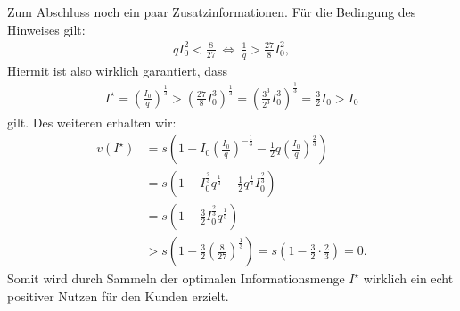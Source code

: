 Zum Abschluss noch ein paar Zusatzinformationen. Für die Bedingung des Hinweises gilt:
\begin{align*}
	q I_0^2 < \frac{8}{27}
	\ \Leftrightarrow \
	\frac{1}{q} > \frac{27 }{8} I_0^2,
\end{align*}
Hiermit ist also wirklich garantiert, dass
\begin{align*}
	I^\star 
	= 
	\left(\frac{I_0}{q}\right)^\frac{1}{3}
	>
	\left(\frac{27}{8} I_0^3\right)^\frac{1}{3}
	=
	\left(\frac{3^3}{2^3} I_0^3\right)^\frac{1}{3}
	= \frac{3}{2} I_0 > I_0
\end{align*}
gilt. Des weiteren erhalten wir:
\begin{align*}
	v(I^\star )
	&=
	s 
	\left(
		1 
		- 
		I_0 \left(\frac{I_0}{q}\right)^{-\frac{1}{3}}
		-
		\frac{1}{2} q \left(\frac{I_0}{q}\right)^{\frac{2}{3}}
	\right)\\
	&=
	s 
	\left(
	1 
	- 
	I_0^{\frac{2}{3}} q^{\frac{1}{3}}
	-
	\frac{1}{2} q^{\frac{1}{3}} I_0^\frac{2}{3}
	\right)\\
	&=
	s 
	\left(
	1 
	- 
	\frac{3}{2}
	I_0^{\frac{2}{3}} q^{\frac{1}{3}}
	\right)\\
	&> 
	s 
	\left(
	1 
	- 
	\frac{3}{2} \left(\frac{8}{27}\right)^\frac{1}{3}
	\right)
	=
	s 
	\left(
	1 
	- 
	\frac{3}{2} \cdot \frac{2}{3}
	\right)
	= 0.
\end{align*}
Somit wird durch Sammeln der optimalen Informationsmenge $I^\star$ wirklich ein echt positiver Nutzen für den Kunden erzielt.

